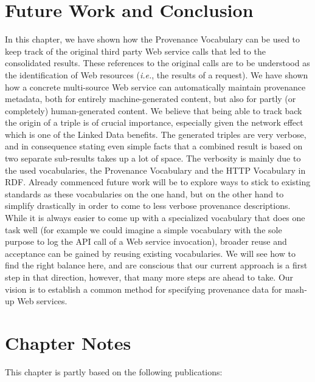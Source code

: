 \section{Future Work and Conclusion}                                                        
\label{sec:conclusion}
In this chapter, we have shown how the Provenance
Vocabulary can be used to keep track of the original third party Web service calls that led to the consolidated
results. These references to the original calls are to be understood as the identification of Web resources (\emph{i.e.}, the
results of a request). We have shown how a concrete multi-source Web service can automatically maintain provenance
metadata, both for entirely machine-generated content, but also for partly (or completely) human-generated content. We
believe that being able to track back the origin of a triple is of crucial importance, especially given the network
effect which is one of the Linked Data benefits. The generated triples are very verbose, and in consequence stating even simple facts that a combined result is based on two separate sub-results takes up a lot of space. The verbosity is mainly due to the used vocabularies, the Provenance Vocabulary and the HTTP Vocabulary in RDF.
Already commenced future work will be to explore ways to stick to existing standards as these vocabularies on the one hand, but on the other hand to simplify drastically in order to come to less verbose provenance descriptions. While it is always easier to come up with a specialized vocabulary that does one task well (for example we could imagine a simple vocabulary with the sole purpose to log the API call of a Web service invocation), broader reuse and acceptance can be gained by reusing existing vocabularies. We will see how to find the right balance here, and are conscious that our current approach is a first step in that direction, however, that many more steps are ahead to take. Our vision is to establish a common method for specifying provenance data for mash-up Web services. 

\section*{Chapter Notes}
This chapter is partly based on the following publications:
